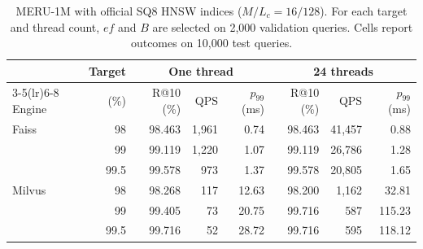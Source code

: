 \begin{table}[!htbp]
 \centering
 \caption{MERU-1M with official SQ8 HNSW indices ($M/L_c=16/128$). For each target and thread count, $ef$ and $B$ are selected on 2,000 validation queries. Cells report outcomes on 10,000 test queries.}
 \label{tab:official_sq8}
 \footnotesize
 \setlength{\tabcolsep}{2.4pt}
 \begin{tabular}{@{}lrrrrrrr@{}}
 \toprule
 & Target & \multicolumn{3}{c}{One thread} & \multicolumn{3}{c}{24 threads}\\
 \cmidrule(lr){3-5}\cmidrule(lr){6-8}
 Engine & (\%) & R@10 (\%) & QPS & $p_{99}$ (ms) & R@10 (\%) & QPS & $p_{99}$ (ms)\\
 \midrule
Faiss & 98 & 98.463 & 1,961 & 0.74 & 98.463 & 41,457 & 0.88 \\
 & 99 & 99.119 & 1,220 & 1.07 & 99.119 & 26,786 & 1.28 \\
 & 99.5 & 99.578 & 973 & 1.37 & 99.578 & 20,805 & 1.65 \\
Milvus & 98 & 98.268 & 117 & 12.63 & 98.200 & 1,162 & 32.81 \\
 & 99 & 99.405 & 73 & 20.75 & 99.716 & 587 & 115.23 \\
 & 99.5 & 99.716 & 52 & 28.72 & 99.716 & 595 & 118.12 \\
 \bottomrule
 \end{tabular}
\end{table}

